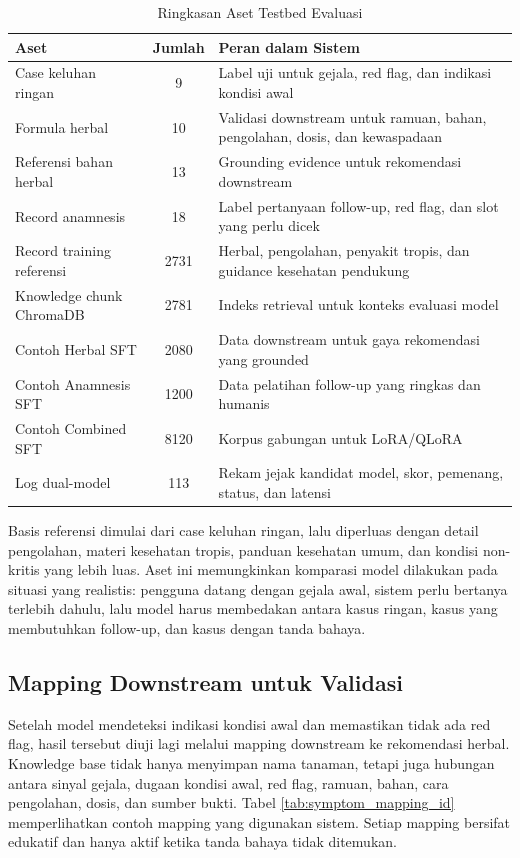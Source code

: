 \documentclass[conference]{IEEEtran}
\begin{document}
\begin{table}[t]
\caption{Ringkasan Aset Testbed Evaluasi}
\label{tab:data_assets_id}
\centering
\scriptsize
\setlength{\tabcolsep}{3pt}
\begin{tabular}{|p{2.05cm}|c|p{3.95cm}|}
\hline
\textbf{Aset} & \textbf{Jumlah} & \textbf{Peran dalam Sistem} \\
\hline
Case keluhan ringan & 9 & Label uji untuk gejala, red flag, dan indikasi kondisi awal \\
\hline
Formula herbal & 10 & Validasi downstream untuk ramuan, bahan, pengolahan, dosis, dan kewaspadaan \\
\hline
Referensi bahan herbal & 13 & Grounding evidence untuk rekomendasi downstream \\
\hline
Record anamnesis & 18 & Label pertanyaan follow-up, red flag, dan slot yang perlu dicek \\
\hline
Record training referensi & 2731 & Herbal, pengolahan, penyakit tropis, dan guidance kesehatan pendukung \\
\hline
Knowledge chunk ChromaDB & 2781 & Indeks retrieval untuk konteks evaluasi model \\
\hline
Contoh Herbal SFT & 2080 & Data downstream untuk gaya rekomendasi yang grounded \\
\hline
Contoh Anamnesis SFT & 1200 & Data pelatihan follow-up yang ringkas dan humanis \\
\hline
Contoh Combined SFT & 8120 & Korpus gabungan untuk LoRA/QLoRA \\
\hline
Log dual-model & 113 & Rekam jejak kandidat model, skor, pemenang, status, dan latensi \\
\hline
\end{tabular}
\end{table}

Basis referensi dimulai dari case keluhan ringan, lalu diperluas dengan detail pengolahan, materi kesehatan tropis, panduan kesehatan umum, dan kondisi non-kritis yang lebih luas. Aset ini memungkinkan komparasi model dilakukan pada situasi yang realistis: pengguna datang dengan gejala awal, sistem perlu bertanya terlebih dahulu, lalu model harus membedakan antara kasus ringan, kasus yang membutuhkan follow-up, dan kasus dengan tanda bahaya.

\subsection{Mapping Downstream untuk Validasi}
Setelah model mendeteksi indikasi kondisi awal dan memastikan tidak ada red flag, hasil tersebut diuji lagi melalui mapping downstream ke rekomendasi herbal. Knowledge base tidak hanya menyimpan nama tanaman, tetapi juga hubungan antara sinyal gejala, dugaan kondisi awal, red flag, ramuan, bahan, cara pengolahan, dosis, dan sumber bukti. Tabel \ref{tab:symptom_mapping_id} memperlihatkan contoh mapping yang digunakan sistem. Setiap mapping bersifat edukatif dan hanya aktif ketika tanda bahaya tidak ditemukan.
\end{document}
